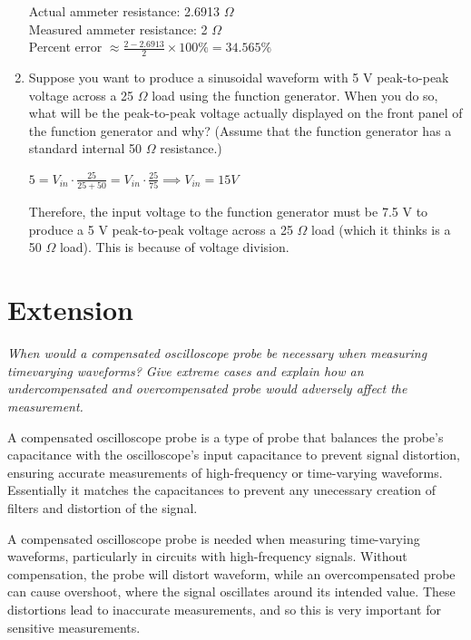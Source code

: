 \documentclass[12pt]{article}
\begin{document}
\begin{enumerate}
Actual ammeter resistance: 2.6913 $\Omega$ \\
Measured ammeter resistance: 2 $\Omega$ \\
Percent error $\approx \frac{2 - 2.6913}{2} \times 100\% = 34.565\%$

\item Suppose you want to produce a sinusoidal waveform with 5 V peak-to-peak voltage across a 25 $\Omega$ load using the function generator. When you do so, what will be the peak-to-peak voltage actually displayed on the front panel of the function generator and why? (Assume that the function generator has a standard internal 50 $\Omega$ resistance.)

$5 = V_{in} \cdot \frac{25}{25 + 50} = V_{in} \cdot \frac{25}{75} \implies V_{in} = 15 V$

Therefore, the input voltage to the function generator must be 7.5 V to produce a 5 V peak-to-peak voltage across a 25 $\Omega$ load (which it thinks is a 50 $\Omega$ load). 
This is because of voltage division.

\end{enumerate}

\section{Extension}

\textit{When would a compensated oscilloscope probe be necessary when measuring timevarying waveforms? Give extreme cases and explain how an undercompensated and
overcompensated probe would adversely affect the measurement.}

A compensated oscilloscope probe is a type of probe that balances the probe's capacitance with the oscilloscope's input capacitance to prevent signal distortion, ensuring accurate measurements of high-frequency or time-varying waveforms.
Essentially it matches the capacitances to prevent any unecessary creation of filters and distortion of the signal.

A compensated oscilloscope probe is needed when measuring time-varying waveforms, particularly in circuits with high-frequency signals. Without compensation, the probe will distort waveform, while an overcompensated probe can cause overshoot, where the signal oscillates around its intended value. These distortions lead to inaccurate measurements, and so this is very important for sensitive measurements.
\end{document}
